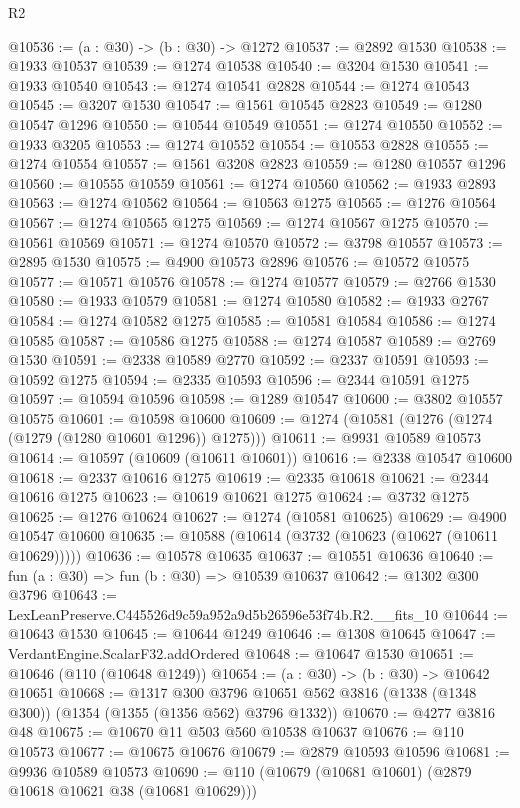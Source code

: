 \begin{lexlean}{R2}
\begin{coremodule}
@10536 := (a : @30) -> (b : @30) -> @1272
@10537 := @2892 @1530
@10538 := @1933 @10537
@10539 := @1274 @10538
@10540 := @3204 @1530
@10541 := @1933 @10540
@10543 := @1274 @10541 @2828
@10544 := @1274 @10543
@10545 := @3207 @1530
@10547 := @1561 @10545 @2823
@10549 := @1280 @10547 @1296
@10550 := @10544 @10549
@10551 := @1274 @10550
@10552 := @1933 @3205
@10553 := @1274 @10552
@10554 := @10553 @2828
@10555 := @1274 @10554
@10557 := @1561 @3208 @2823
@10559 := @1280 @10557 @1296
@10560 := @10555 @10559
@10561 := @1274 @10560
@10562 := @1933 @2893
@10563 := @1274 @10562
@10564 := @10563 @1275
@10565 := @1276 @10564
@10567 := @1274 @10565 @1275
@10569 := @1274 @10567 @1275
@10570 := @10561 @10569
@10571 := @1274 @10570
@10572 := @3798 @10557
@10573 := @2895 @1530
@10575 := @4900 @10573 @2896
@10576 := @10572 @10575
@10577 := @10571 @10576
@10578 := @1274 @10577
@10579 := @2766 @1530
@10580 := @1933 @10579
@10581 := @1274 @10580
@10582 := @1933 @2767
@10584 := @1274 @10582 @1275
@10585 := @10581 @10584
@10586 := @1274 @10585
@10587 := @10586 @1275
@10588 := @1274 @10587
@10589 := @2769 @1530
@10591 := @2338 @10589 @2770
@10592 := @2337 @10591
@10593 := @10592 @1275
@10594 := @2335 @10593
@10596 := @2344 @10591 @1275
@10597 := @10594 @10596
@10598 := @1289 @10547
@10600 := @3802 @10557 @10575
@10601 := @10598 @10600
@10609 := @1274 (@10581 (@1276 (@1274 (@1279 (@1280 @10601 @1296)) @1275)))
@10611 := @9931 @10589 @10573
@10614 := @10597 (@10609 (@10611 @10601))
@10616 := @2338 @10547 @10600
@10618 := @2337 @10616 @1275
@10619 := @2335 @10618
@10621 := @2344 @10616 @1275
@10623 := @10619 @10621 @1275
@10624 := @3732 @1275
@10625 := @1276 @10624
@10627 := @1274 (@10581 @10625)
@10629 := @4900 @10547 @10600
@10635 := @10588 (@10614 (@3732 (@10623 (@10627 (@10611 @10629)))))
@10636 := @10578 @10635
@10637 := @10551 @10636
@10640 := fun (a : @30) => fun (b : @30) => @10539 @10637
@10642 := @1302 @300 @3796
@10643 := LexLeanPreserve.C445526d9c59a952a9d5b26596e53f74b.R2.__fits_10
@10644 := @10643 @1530
@10645 := @10644 @1249
@10646 := @1308 @10645
@10647 := VerdantEngine.ScalarF32.addOrdered
@10648 := @10647 @1530
@10651 := @10646 (@110 (@10648 @1249))
@10654 := (a : @30) -> (b : @30) -> @10642 @10651
@10668 := @1317
    @300
    @3796
    @10651
    @562
    @3816
    (@1338 (@1348 @300))
    (@1354 (@1355 (@1356 @562) @3796 @1332))
@10670 := @4277 @3816 @48
@10675 := @10670 @11 @503 @560 @10538 @10637
@10676 := @110 @10573
@10677 := @10675 @10676
@10679 := @2879 @10593 @10596
@10681 := @9936 @10589 @10573
@10690 := @110 (@10679 (@10681 @10601) (@2879 @10618 @10621 @38 (@10681 @10629)))

\end{coremodule}
\end{lexlean}
